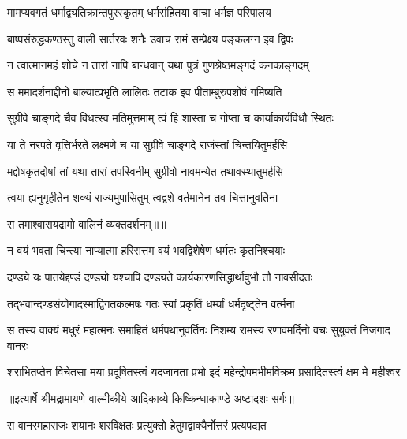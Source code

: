 \twolineshloka
{मामप्यवगतं धर्माद्व्यतिक्रान्तपुरस्कृतम्}
{धर्मसंहितया वाचा धर्मज्ञ परिपालय} %

\twolineshloka
{बाष्पसंरुद्धकण्ठस्तु वाली सार्तरवः शनैः}
{उवाच रामं सम्प्रेक्ष्य पङ्कलग्न इव द्विपः} %

\twolineshloka
{न त्वात्मानमहं शोचे न तारां नापि बान्धवान्}
{यथा पुत्रं गुणश्रेष्ठमङ्गदं कनकाङ्गदम्} %

\twolineshloka
{स ममादर्शनाद्दीनो बाल्यात्प्रभृति लालितः}
{तटाक इव पीताम्बुरुपशोषं गमिष्यति} %

\twolineshloka
{सुग्रीवे चाङ्गदे चैव विधत्स्व मतिमुत्तमाम्}
{त्वं हि शास्ता च गोप्ता च कार्याकार्यविधौ स्थितः} %

\twolineshloka
{या ते नरपते वृत्तिर्भरते लक्ष्मणे च या}
{सुग्रीवे चाङ्गदे राजंस्तां चिन्तयितुमर्हसि} %

\twolineshloka
{मद्दोषकृतदोषां तां यथा तारां तपस्विनीम्}
{सुग्रीवो नावमन्येत तथावस्थातुमर्हसि} %

\twolineshloka
{त्वया ह्यनुगृहीतेन शक्यं राज्यमुपासितुम्}
{त्वद्वशे वर्तमानेन तव चित्तानुवर्तिना} %

{स तमाश्वासयद्रामो वालिनं व्यक्तदर्शनम्॥॥} %

\addtocounter{shlokacount}{1}

\twolineshloka
{न वयं भवता चिन्त्या नाप्यात्मा हरिसत्तम}
{वयं भवद्विशेषेण धर्मतः कृतनिश्चयाः} %

\twolineshloka
{दण्ड्ये यः पातयेद्दण्डं दण्ड्यो यश्चापि दण्ड्यते}
{कार्यकारणसिद्धार्थावुभौ तौ नावसीदतः} %

\twolineshloka
{तद्भवान्दण्डसंयोगादस्माद्विगतकल्मषः}
{गतः स्वां प्रकृतिं धर्म्यां धर्मदृष्ट्तेन वर्त्मना} %

\fourlineindentedshloka
{स तस्य वाक्यं मधुरं महात्मनः}
{समाहितं धर्मपथानुवर्तिनः}
{निशम्य रामस्य रणावमर्दिनो}
{वचः सुयुक्तं निजगाद वानरः} %

\fourlineindentedshloka
{शराभितप्तेन विचेतसा मया}
{प्रदूषितस्त्वं यदजानता प्रभो}
{इदं महेन्द्रोपमभीमविक्रम}
{प्रसादितस्त्वं क्षम मे महीश्वर} %


{॥इत्यार्षे श्रीमद्रामायणे वाल्मीकीये आदिकाव्ये किष्किन्धाकाण्डे अष्टादशः सर्गः॥}


\twolineshloka
{स वानरमहाराजः शयानः शरविक्षतः}
{प्रत्युक्तो हेतुमद्वाक्यैर्नोत्तरं प्रत्यपद्यत} %

